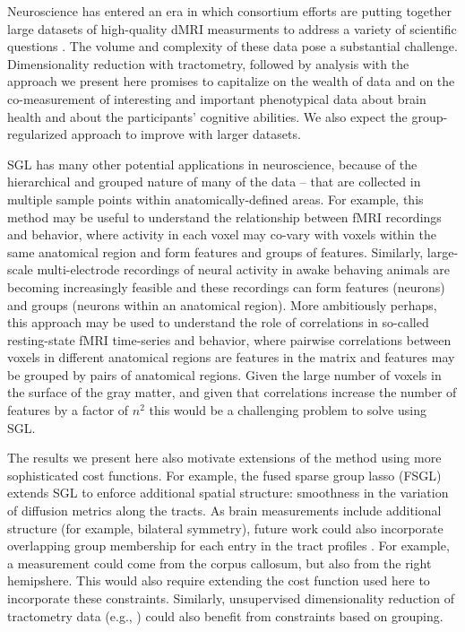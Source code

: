 Neuroscience has entered an era in which consortium efforts are putting together
large datasets of high-quality dMRI measurments to address a variety of
scientific questions \cite{jernigan2016ping, jernigan2018abcd,
alexander2017open, Miller2016-hw, VanEssen2012}. The volume and complexity of
these data pose a substantial challenge. Dimensionality reduction with
tractometry, followed by analysis with the approach we present here promises to
capitalize on the wealth of data and on the co-measurement of interesting and
important phenotypical data about brain health and about the participants'
cognitive abilities. We also expect the group-regularized approach to improve
with larger datasets.

SGL has many other potential applications in neuroscience, because of the
hierarchical and grouped nature of many of the data -- that are collected in
multiple sample points within anatomically-defined areas. For example, this
method may be useful to understand the relationship between fMRI recordings and
behavior, where activity in each voxel may co-vary with voxels within the same
anatomical region and form features and groups of features. Similarly,
large-scale multi-electrode recordings of neural activity in awake behaving
animals are becoming increasingly feasible \cite{steinmetz2018distributed,
Jun2017-gv} and these recordings can form features (neurons) and groups (neurons
within an anatomical region). More ambitiously perhaps, this approach may be
used to understand the role of correlations in so-called resting-state fMRI
time-series and behavior, where pairwise correlations between voxels in
different anatomical regions are features in the matrix and features may be
grouped by pairs of anatomical regions. Given the large number of voxels in the
surface of the gray matter, and given that correlations increase the number of
features by a factor of $n^2$ this would be a challenging problem to solve using
SGL.

The results we present here also motivate extensions of the method using more
sophisticated cost functions. For example, the fused sparse group lasso (FSGL)
\cite{zhou2012} extends SGL to enforce additional spatial structure: smoothness
in the variation of diffusion metrics along the tracts. As brain measurements
include additional structure (for example, bilateral symmetry), future work
could also incorporate overlapping group membership for each entry in the tract
profiles \cite{Rao2014-xm}. For example, a measurement could come from the
corpus callosum, but also from the right hemipshere. This would also require
extending the cost function used here to incorporate these constraints.
Similarly, unsupervised dimensionality reduction of tractometry data (e.g.,
\cite{Chamberland2019-mu}) could also benefit from constraints based on
grouping.

